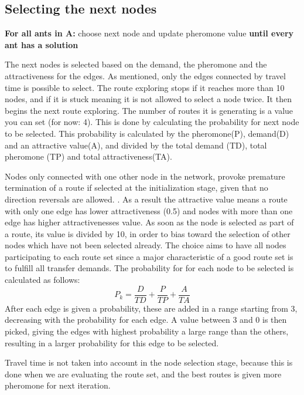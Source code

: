 \subsection{Selecting the next nodes}
\textbf{For all ants in A:} choose next node and update pheromone value\textbf{ until every ant has a solution }

The next nodes is selected based on the demand, the pheromone and the attractiveness for the edges. As mentioned, only the edges connected by travel time is possible to select. The route exploring stops if it reaches more than 10 nodes, and if it is stuck meaning it is not allowed to select a node twice. It then begins the next route exploring. The number of routes it is generating is a value you can set (for now: 4).
This is done by calculating the probability for next node to be selected. This probability is calculated by the pheromone(P), demand(D) and an attractive value(A), and divided by the total demand (TD), total pheromone (TP) and total attractiveness(TA).

Nodes only connected with one other node in the network, provoke premature termination of a route if selected at the initialization stage, given that no direction reversals are allowed. \citep{kechagiopoulos14}. As a result the attractive value means a route with only one edge has lower attractiveness (0.5) and nodes with more than one edge has higher attractivenesses value. As soon as the node is selected as part of a route, its value is divided by 10, in order to bias toward the selection of other nodes which have not been selected already. The choice aims to have all nodes participating to each route set since a major characteristic of a good route set is to fulfill all transfer demands. %
The probability for for each node to be selected is calculated as follows:
$$ P_{k} = \frac{D}{TD} + \frac{P}{TP} + \frac{A}{TA}$$
After each edge is given a probability, these are added in a range starting from 3, decreasing with the probability for each edge. A value between 3 and 0 is then picked, giving the edges with highest probability a large range than the others, resulting in a larger probability for this edge to be selected. 

Travel time is not taken into account in the node selection stage, because this is done when we are evaluating the route set, and the best routes is given more pheromone for next iteration. %

